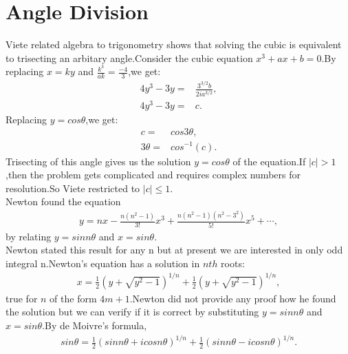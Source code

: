 \documentclass[a4paper,reqno,11pt]{book}
\theoremstyle{plain}%
\theoremstyle{definition}
\begin{document}
\section{Angle Division}
Viete related algebra to trigonometry shows that solving the cubic is equivalent to trisecting an arbitary angle.Consider the cubic equation $x^3+ax+b=0$.By replacing $x=ky$ and $\frac{k^3}{ak}=\frac{-4}{3}$,we get:
\begin{align*}
    4y^3-3y=&\frac{3^{3/2}b}{2ia^{3/2}},\\
    4y^3-3y=&c.
\end{align*}
Replacing $y=cos\theta$,we get:
\begin{align*}
    c=&cos3\theta,\\
    3\theta=&cos^{-1}(c).
\end{align*}
Trisecting of this angle gives us the solution $y=cos\theta$ of the equation.If $\left|c\right|>1$,then the problem gets complicated and requires complex numbers for resolution.So Viete restricted to $\left|c\right|\leq1$.\\
Newton found the equation
\begin{eqnarray*}
    y=nx-\frac{n(n^2-1)}{3!}x^3+\frac{n(n^2-1)(n^2-3^2)}{5!}x^5+\cdots,
\end{eqnarray*}
by relating $y=sinn\theta$ and $x=sin\theta$.\\
Newton stated this result for any n but at present we are interested in only odd integral n.Newton's equation has a solution in $nth$ roots:
\begin{eqnarray*}
    x=\frac{1}{2}(y+\sqrt{y^2-1})^{1/n}+\frac{1}{2}(y+\sqrt{y^2-1})^{1/n},
\end{eqnarray*}
true for $n$ of the form $4m+1$.Newton did not provide any proof how he found the solution but we can verify if it is correct by substituting $y=sinn\theta$ and $x=sin\theta$.By de Moivre's formula,
\begin{eqnarray*}
    sin\theta=\frac{1}{2}(sinn\theta+icosn\theta)^{1/n}+\frac{1}{2}(sinn\theta-icosn\theta)^{1/n}.
\end{eqnarray*}
\end{document}
